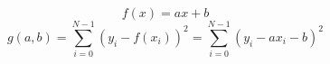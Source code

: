 \documentclass{article}
\begin{document}
    \begin{equation}
        f(x) = ax + b
    \end{equation}
    \begin{equation}
        g(a, b) = \sum_{i=0}^{N-1}\left(y_i - f(x_i)\right)^2
                = \sum_{i=0}^{N-1}\left(y_i - a x_i - b\right)^2
    \end{equation}
\end{document}
